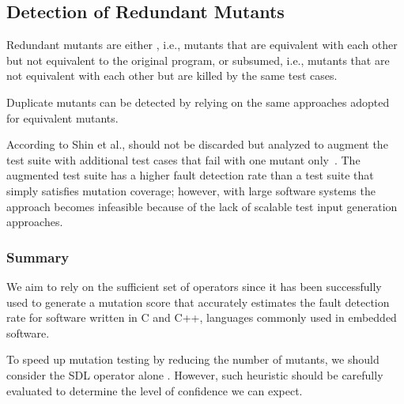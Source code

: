 
\subsection{Detection of Redundant Mutants}
\label{sec:background:redundant}
Redundant mutants are either , i.e., mutants that are equivalent with each other but not equivalent to the original program, or subsumed, i.e., mutants that are not equivalent with each other but are killed by the same test cases. 

Duplicate mutants can be detected by relying on the same approaches adopted for equivalent mutants. 

According to Shin et al.,  should not be discarded but analyzed to augment the test suite with additional test cases that fail with one mutant only~\cite{Shin:TSE:DCriterion:2018}. 
The augmented test suite has a higher
 fault detection rate than a test suite that simply satisfies mutation coverage; however, with large software systems the approach becomes infeasible because of the lack of scalable test input generation approaches.



\subsubsection{Summary}
\label{sec:back:summary}

We aim to rely on the sufficient set of operators since it has been successfully used to generate a mutation score that accurately estimates the fault detection rate for software written in C and C++, languages commonly used in embedded software.

To speed up mutation testing by reducing the number of mutants, we should consider the SDL operator alone . However, such heuristic should be carefully evaluated to determine the level of confidence we can expect.

